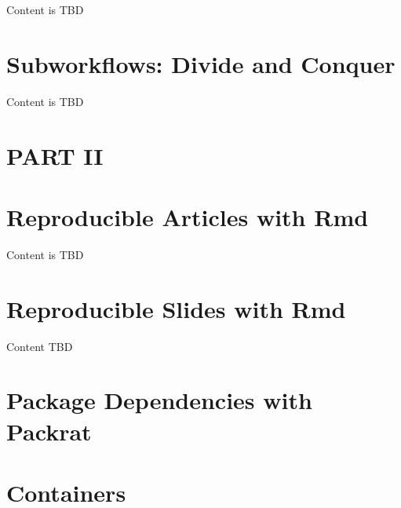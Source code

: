 \documentclass[]{book}
\theoremstyle{definition}
\theoremstyle{definition}
\theoremstyle{definition}
\theoremstyle{remark}
\begin{document}
Content is TBD

\chapter{Subworkflows: Divide and
Conquer}\label{subworkflows-divide-and-conquer}

Content is TBD

\chapter*{PART II}\label{part-ii}

\chapter{Reproducible Articles with
Rmd}\label{reproducible-articles-with-rmd}

Content is TBD

\chapter{Reproducible Slides with
Rmd}\label{reproducible-slides-with-rmd}

Content TBD

\chapter{Package Dependencies with
Packrat}\label{package-dependencies-with-packrat}

\chapter{Containers}\label{containers}


\end{document}
